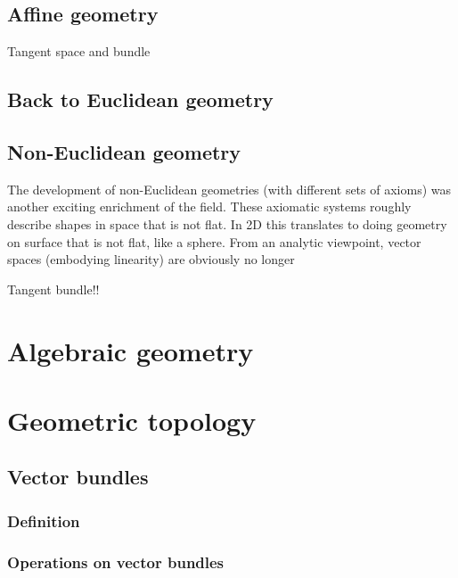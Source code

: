 \section{Affine geometry}
Tangent space and bundle

\section{Back to Euclidean geometry}

\section{Non-Euclidean geometry}
The development of non-Euclidean geometries (with different sets of axioms) was another exciting enrichment of the field. These axiomatic systems roughly describe shapes in space that is not flat. In 2D this translates to doing geometry on surface that is not flat, like a sphere. From an analytic viewpoint, vector spaces (embodying linearity) are obviously no longer 

Tangent bundle!!










\chapter{Algebraic geometry}
\chapter{Geometric topology}
\section{Vector bundles}
\subsection{Definition}
\subsection{Operations on vector bundles}